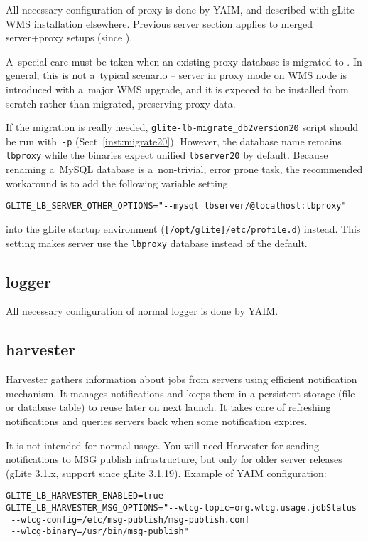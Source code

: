 All necessary configuration of \LB proxy is done by YAIM,
and described with gLite WMS installation elsewhere.
Previous \LB server section applies to merged server+proxy setups (since ).

A~special care must be taken when an existing \LB proxy database
is migrated to .
In general, this is not a~typical scenario --  server in proxy mode
on WMS node is introduced with a~major WMS upgrade, and it is expeced
to be installed from scratch rather than migrated, preserving \LB proxy data.

If the migration is really needed, \verb'glite-lb-migrate_db2version20'
script should be run with~\verb'-p' (Sect~\ref{inst:migrate20}).
However, the \LB database name remains \verb'lbproxy' while
the  binaries expect unified \verb'lbserver20' by default.
Because renaming a~MySQL database is a~non-trivial, error prone task,
the recommended workaround is to add the following variable setting

\verb'GLITE_LB_SERVER_OTHER_OPTIONS="--mysql lbserver/@localhost:lbproxy"' 

into the gLite startup environment (\verb'[/opt/glite]/etc/profile.d') instead.
This setting makes \LB server use the \verb'lbproxy' database instead of the default.

\subsection{\LB logger}

All necessary configuration of normal \LB logger is done by YAIM.

\subsection{\LB harvester}

\LB Harvester gathers information about jobs from \LB servers using efficient
\LB notification mechanism. It manages notifications and keeps them in
a persistent storage (file or database table) to reuse later on next launch.
It takes care of refreshing notifications and queries \LB servers back when
some notification expires.

It is not intended for normal usage. You will need Harvester for sending notifications to MSG publish infrastructure, but only for older \LB server releases (gLite 3.1.x, support since gLite 3.1.19). Example of YAIM configuration:

\begin{verbatim}
GLITE_LB_HARVESTER_ENABLED=true
GLITE_LB_HARVESTER_MSG_OPTIONS="--wlcg-topic=org.wlcg.usage.jobStatus 
 --wlcg-config=/etc/msg-publish/msg-publish.conf 
 --wlcg-binary=/usr/bin/msg-publish"
\end{verbatim}

